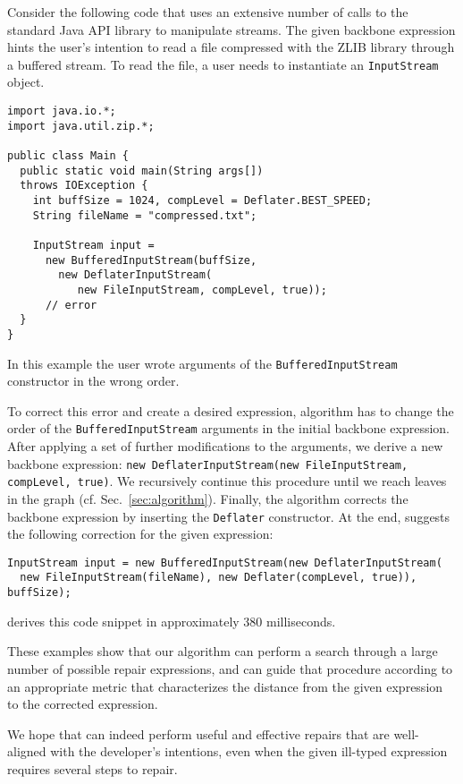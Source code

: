 Consider the following code that uses an extensive number of calls to the standard Java API library to manipulate streams. The given backbone expression hints the user's intention to read a file compressed with the ZLIB library through a buffered stream. To read the file, a user needs to instantiate an \lstinline{InputStream} object.
\begin{lstlisting}
import java.io.*;
import java.util.zip.*;

public class Main {
  public static void main(String args[]) 
  throws IOException {
    int buffSize = 1024, compLevel = Deflater.BEST_SPEED;
    String fileName = "compressed.txt";
    
    InputStream input = 
      new BufferedInputStream(buffSize,
        new DeflaterInputStream(
           new FileInputStream, compLevel, true)); 
      // error
  }
}
\end{lstlisting}

In this example the user wrote arguments of the \lstinline{BufferedInputStream} constructor in the wrong order.

To correct this error and create a desired expression, \ourTool algorithm has to change the order of the \lstinline{BufferedInputStream} arguments in the initial backbone expression. After applying a set of further modifications to the arguments, we derive a new backbone expression: \lstinline{new DeflaterInputStream(new FileInputStream, compLevel, true)}. We recursively continue this procedure until we reach leaves in the \ourTool graph (cf. Sec.~\ref{sec:algorithm}). Finally, the algorithm corrects the backbone expression by inserting the \lstinline{Deflater} constructor. At the end, \ourTool suggests the following correction for the given expression:
\begin{lstlisting}    
InputStream input = new BufferedInputStream(new DeflaterInputStream(
  new FileInputStream(fileName), new Deflater(compLevel, true)), buffSize);
\end{lstlisting}
\ourTool derives this code snippet in approximately 380 milliseconds.

These examples show that our algorithm can perform a search through a large number of possible repair expressions, and can guide that procedure according to an appropriate metric that characterizes the distance from the given expression to the corrected expression.

We hope that \ourTool can indeed perform useful and effective repairs that are well-aligned with the developer's intentions, even when the given ill-typed expression requires several steps to repair.  

